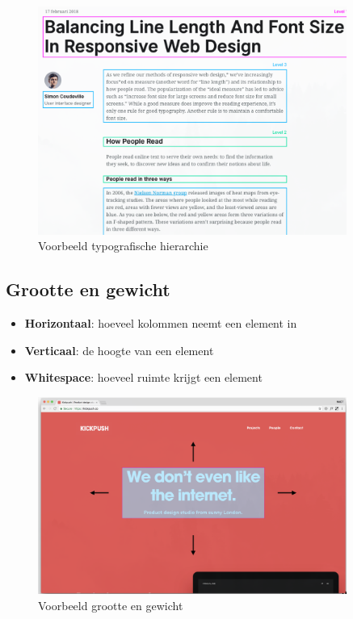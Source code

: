 \documentclass{article}
\newcommand{\bold}[1]{\textbf{#1}}
\begin{document}
\begin{figure}[H]
    \centering
    \includegraphics[width=0.9\textwidth]{img/Screenshot_20200302_083956.png}    
    \caption{Voorbeeld typografische hierarchie}
\end{figure}

\subsection{Grootte en gewicht}

\begin{itemize}
    \item \bold{Horizontaal}: hoeveel kolommen neemt een element in
    \item \bold{Verticaal}: de hoogte van een element
    \item \bold{Whitespace}: hoeveel ruimte krijgt een element
\end{itemize}

\begin{figure}[H]
    \centering
    \includegraphics[width=0.9\textwidth]{img/Screenshot_20200302_084302.png}    
    \caption{Voorbeeld grootte en gewicht}
\end{figure}
\end{document}
